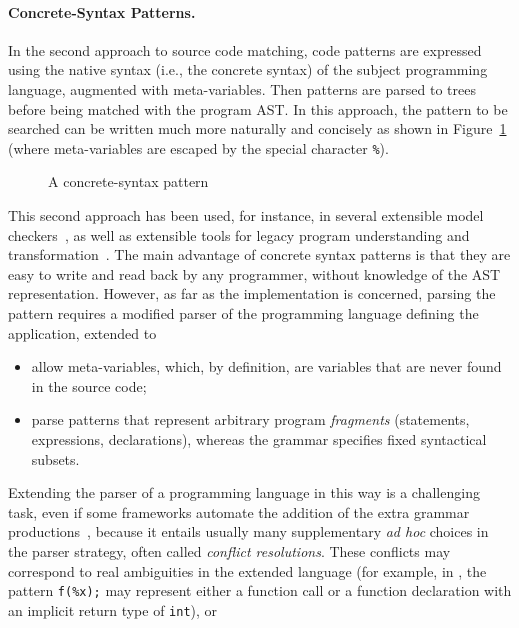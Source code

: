 \paragraph{Concrete\hyp{}Syntax Patterns.}

In the second approach to source code matching, code patterns are
expressed using the native syntax (i.e., the concrete syntax) of the
subject programming language, augmented with meta\hyp{}variables. Then
patterns are parsed to trees before being matched with the program
AST. In this approach, the pattern to be searched can be written much
more naturally and concisely as shown in
Figure~\ref{intro:concrete_pattern} (where meta\hyp{}variables are
escaped by the special character \texttt{\%}).
\begin{figure}
%
\caption{A concrete\hyp{}syntax pattern\label{intro:concrete_pattern}}
\end{figure}
\noindent This second approach has been used, for instance, in several
extensible model checkers~\cite{cecil,mc,mj,blast}, as well as
extensible tools for legacy program understanding and
transformation~\cite{native,behavioral}. The main advantage of
concrete syntax patterns is that they are easy to write and read back
by any programmer, without knowledge of the AST
representation. However, as far as the implementation is concerned,
parsing the pattern requires a modified parser of the programming
language defining the application, extended to
\begin{itemize}

  \item allow meta\hyp{}variables, which, by definition, are variables
    that are never found in the source code;

  \item parse patterns that represent arbitrary program
    \emph{fragments} (statements, expressions, declarations), whereas
    the grammar specifies fixed syntactical subsets.
\end{itemize}
Extending the parser of a programming language in this way is a
challenging task, even if some frameworks automate the addition of the
extra grammar productions~\cite{refine}, because it entails usually
many supplementary \emph{ad hoc} choices in the parser strategy, often
called \emph{conflict resolutions}. These conflicts may correspond to
real ambiguities in the extended language (for example, in \Clang, the
pattern \texttt{f(\%x);} may represent either a function call or a
function declaration with an implicit return type of \texttt{int}), or
